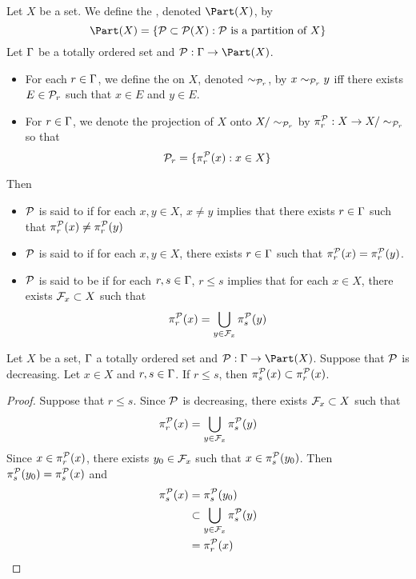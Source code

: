 \documentclass{book}
\begin{document}
\begin{defn}
	Let $X$ be a set. We define the , denoted $\Part(X)$, by 
	$$\Part(X) = \{\MP \subset \MP(X): \MP \text{ is a partition of $X$}\}$$ 
	Let $\Gamma$ be a totally ordered set and $\MP: \Gam \rightarrow \Part(X)$. 
	\begin{itemize}
		\item For each $r \in \Gamma$, we define the  on $X$, denoted $\sim_{\mathcal{P}_r}$, by $x \sim_{\mathcal{P}_r} y$ iff there exists $E \in \mathcal{P}_r$ such that $x \in E$ and $y \in E$.
		\item For $r \in \Gamma$, we denote the projection of $X$ onto $X/\sim_{\mathcal{P}_r}$ by $\pi^{\mathcal{P}}_r: X \rightarrow X/ \sim_{\mathcal{P}_r}$ so that 
		$$\mathcal{P}_r = \{\pi^{\mathcal{P}}_r(x): x \in X\}$$ 
	\end{itemize}
	Then 
	\begin{itemize}
		\item $\mathcal{P}$ is said to  if for each $x,y \in X$, $x \neq y$ implies that there exists $r \in \Gamma$ such that $\pi^{\mathcal{P}}_r(x) \neq \pi^{\mathcal{P}}_r(y)$
		\item $\mathcal{P}$ is said to  if for each $x,y \in X$, there exists $r \in \Gamma$ such that $\pi^{\mathcal{P}}_{r}(x) = \pi^{\mathcal{P}}_{r}(y)$.
		\item $\mathcal{P}$ is said to be 
		 if for each $r,s \in \Gamma$, $r \leq s$ implies that for each $x \in X$, there exists $\mathcal{F}_x \subset X$ such that 
		$$\pi^{\mathcal{P}}_r(x) = \bigcup\limits_{y \in \mathcal{F}_x} \pi^{\mathcal{P}}_s(y)$$
	\end{itemize}
\end{defn}

\begin{ex}
	Let $X$ be a set, $\Gamma$ a totally ordered set and $\MP: \Gam \rightarrow \Part(X)$. Suppose that $\mathcal{P}$ is decreasing. Let $x\in X$ and $r, s \in \Gamma$. If $r \leq s$, then $\pi^{\mathcal{P}}_s(x) \subset \pi^{\mathcal{P}}_r(x)$.
\end{ex}

\begin{proof}
	Suppose that $r \leq s$. Since $\mathcal{P}$ is decreasing, there exists $\mathcal{F}_x \subset X$ such that 
	$$\pi^{\mathcal{P}}_r(x) = \bigcup\limits_{y \in \mathcal{F}_x} \pi^{\mathcal{P}}_s(y)$$ 
	Since $x \in \pi^{\mathcal{P}}_r(x)$, there exists $y_0 \in \mathcal{F}_x$ such that $x \in \pi^{\mathcal{P}}_s(y_0)$. Then $\pi^{\mathcal{P}}_s(y_0) = \pi^{\mathcal{P}}_s(x)$ and 
	\begin{align*}
		\pi^{\mathcal{P}}_s(x)
		& = \pi^{\mathcal{P}}_s(y_0) \\
		& \subset \bigcup\limits_{y \in \mathcal{F}_x} \pi^{\mathcal{P}}_s(y) \\
		& = \pi^{\mathcal{P}}_r(x)
	\end{align*}
\end{proof}
\end{document}
